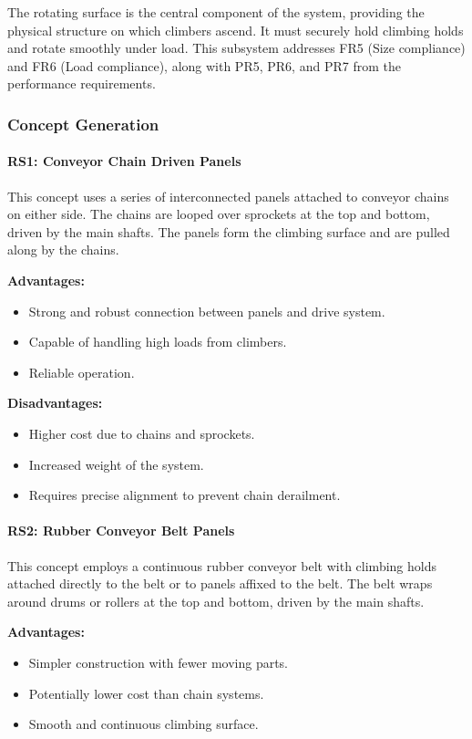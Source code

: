 The rotating surface is the central component of the system, providing the physical structure on which climbers ascend. It must securely hold climbing holds and rotate smoothly under load. This subsystem addresses FR5 (Size compliance) and FR6 (Load compliance), along with PR5, PR6, and PR7 from the performance requirements.

\subsubsection{Concept Generation}

\paragraph{RS1: Conveyor Chain Driven Panels}

This concept uses a series of interconnected panels attached to conveyor chains on either side. The chains are looped over sprockets at the top and bottom, driven by the main shafts. The panels form the climbing surface and are pulled along by the chains.

\textbf{Advantages:}
\begin{itemize}
    \item Strong and robust connection between panels and drive system.
    \item Capable of handling high loads from climbers.
    \item Reliable operation.
\end{itemize}

\textbf{Disadvantages:}
\begin{itemize}
    \item Higher cost due to chains and sprockets.
    \item Increased weight of the system.
    \item Requires precise alignment to prevent chain derailment.
\end{itemize}

\paragraph{RS2: Rubber Conveyor Belt Panels}

This concept employs a continuous rubber conveyor belt with climbing holds attached directly to the belt or to panels affixed to the belt. The belt wraps around drums or rollers at the top and bottom, driven by the main shafts.

\textbf{Advantages:}
\begin{itemize}
    \item Simpler construction with fewer moving parts.
    \item Potentially lower cost than chain systems.
    \item Smooth and continuous climbing surface.
\end{itemize}

